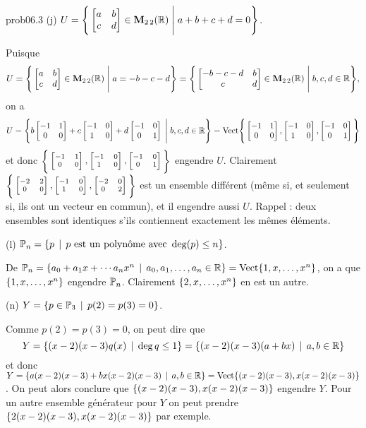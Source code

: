 \begin{sol}{prob06.3}
 \medskip
(j)  $U=\Bigg\{  \bmatrix a&b\\ c&d\endbmatrix \in \M_{2 \,2}(\R) \;\Bigg|\; a+b+c+d=0\Bigg\}$.   

\soln

Puisque $$U=\Bigg\{  \bmatrix a&b\\ c&d\endbmatrix \in \M_{2 \,2}(\R) \;\Bigg|\; a=-b-c-d\Bigg\}=\Bigg\{  \bmatrix -b-c-d&b\\ c&d\endbmatrix \in \M_{2 \,2}(\R) \;\Bigg|\; b,c,d\in \R\Bigg\},$$ 
on a 
$$U=\Bigg\{b \bmatrix -1 &1\\ 0&0\endbmatrix+c \bmatrix -1&0\\ 1&0\endbmatrix+ d\bmatrix -1&0\\ 0&1\endbmatrix \;\Bigg|\; b,c,d\in \R\Bigg\}=\text{Vect}\Bigg\{ \bmatrix -1 &1\\ 0&0\endbmatrix,\bmatrix -1&0\\ 1&0\endbmatrix,  \bmatrix -1&0\\ 0&1\endbmatrix \Bigg\}$$ 
et donc $\scriptsize\Bigg\{ \bmatrix -1 &1\\ 0&0\endbmatrix,\bmatrix -1&0\\ 1&0\endbmatrix,  \bmatrix -1&0\\ 0&1\endbmatrix \Bigg\}$ engendre $U$. 
Clairement $\scriptsize\Bigg\{ \bmatrix -2 &2\\ 0&0\endbmatrix,\bmatrix -1&0\\ 1&0\endbmatrix,  \bmatrix -2&0\\ 0&2\endbmatrix \Bigg\}$ est un ensemble diff\'erent (m\^eme si, et seulement si, ils ont un vecteur en commun), et il engendre aussi $U$. Rappel : deux ensembles sont identiques s'ils contiennent exactement les mêmes éléments.
   \medskip

(l) $ \mathbb{P}_n=\{p\, \mid \, p \text{ est un polyn\^ome avec } \deg(p)\le n\} $.

\soln De $ \mathbb{P}_n=\{a_0 + a_1 x +\cdots a_n x^n \, \mid \, a_0, a_1, \dots, a_n \in \mathbb{R}\}=\operatorname{ Vect} \normalsize\{1, x, \dots, x^n\normalsize\}$, on a que $\{1, x, \dots, x^n\}$ engendre $ \mathbb{P}_n$. Clairement $\{2, x, \dots, x^n\}$ en est un autre.\medskip 


(n)  $ Y=\{p \in \mathbb{P}_3 \, \mid \,  p(2)=p(3)=0\}$. 

\soln Comme $p(2)=p(3)=0$, on peut dire que $$Y=\{(x-2)(x-3)q(x)\, \mid \, \deg q \le 1\}=\{(x-2)(x-3)(a+bx)\, \mid \, a,b \in \mathbb{R}\}$$ et donc  $Y=\{a(x-2)(x-3) + b x(x-2)(x-3)\, \mid \, a,b \in \mathbb{R} \}=\operatorname{ Vect} \normalsize\{(x-2)(x-3), x(x-2)(x-3)\normalsize\}$. On peut alors conclure que $\{(x-2)(x-3), x(x-2)(x-3)\}$ engendre $Y$.  Pour un autre ensemble g\'en\'erateur pour $Y$  on peut prendre $\{2(x-2)(x-3), x(x-2)(x-3)\}$ par exemple.
\medskip




\end{sol}
